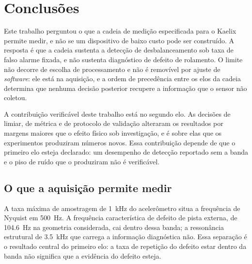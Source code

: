 
\makeatletter
{}
\makeatother

\chapter{Conclusões}
\label{cap:conclusoes}

Este trabalho perguntou o que a cadeia de medição especificada para o Kaelix permite
medir, e não se um dispositivo de baixo custo pode ser construído. A resposta é que a
cadeia sustenta a detecção de desbalanceamento sob taxa de falso alarme fixada, e não sustenta diagnóstico de defeito de rolamento. O limite
não decorre de escolha de processamento e não é removível por ajuste de \emph{software}:
ele está na aquisição, e a ordem de precedência entre os elos da cadeia determina que
nenhuma decisão posterior recupere a informação que o sensor não coletou.

A contribuição verificável deste trabalho está no segundo elo. As decisões de limiar, de
métrica e de protocolo de validação alteraram os resultados por margens maiores que o
efeito físico sob investigação, e é sobre elas que os experimentos produziram números
novos. Essa contribuição depende de que o primeiro elo esteja declarado: um desempenho de
detecção reportado sem a banda e o piso de ruído que o produziram não é verificável.

\section{O que a aquisição permite medir}
\label{sec:conc-aquisicao}

A taxa máxima de amostragem de \SI{1}{\kilo\hertz} do acelerômetro situa a frequência de
Nyquist em \SI{500}{\hertz}. A frequência característica de defeito de pista externa, de
\SI{104,6}{\hertz} na geometria considerada, cai dentro dessa banda; a ressonância
estrutural de \SI{3,5}{\kilo\hertz} que carrega a informação diagnóstica não. Essa
separação é o resultado central do primeiro elo: a taxa de repetição do defeito estar
dentro da banda não significa que a evidência do defeito esteja.

